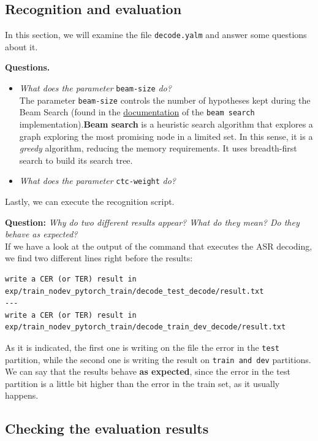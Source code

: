 \documentclass[a4paper]{article}
\def\inline{\lstinline[basicstyle=\ttfamily,keywordstyle={}]}
\begin{document}
\subsection{Recognition and evaluation}

In this section, we will examine the file \inline{decode.yalm} and answer some questions about it.

\textbf{Questions.}
\begin{itemize}
\item \emph{What does the parameter} \inline{beam-size} \emph{do?}\\

        The parameter \inline{beam-size} controls the number of hypotheses kept during the Beam Search (found in the \href{https://espnet.github.io/espnet/_gen/espnet.nets.html?highlight=beam#espnet-nets-batch-beam-search}{documentation} of the \inline{beam search} implementation).\textbf{Beam search} is a heuristic search algorithm that explores a graph exploring the most promising node in a limited set. In this sense, it is a \emph{greedy} algorithm, reducing the memory requirements. It uses breadth-first search to build its search tree.

\item \emph{What does the parameter} \inline{ctc-weight} \emph{do?}\\
\end{itemize}


Lastly, we can execute the recognition script.

\textbf{Question:} \emph{Why do two different results appear? What do they mean? Do they behave as expected?}\\
If we have a look at the output of the command that executes the ASR decoding, we find two different lines right before the results:
\begin{verbatim}
write a CER (or TER) result in exp/train_nodev_pytorch_train/decode_test_decode/result.txt
---
write a CER (or TER) result in exp/train_nodev_pytorch_train/decode_train_dev_decode/result.txt
\end{verbatim}

As it is indicated, the first one is writing on the file the error in the \inline{test} partition, while the second one is writing the result on \inline{train and dev} partitions. We can say that the results behave \textbf{as expected}, since the error in the test partition is a little bit higher than the error in the train set, as it usually happens.
\subsection{Checking the evaluation results}
\end{document}
